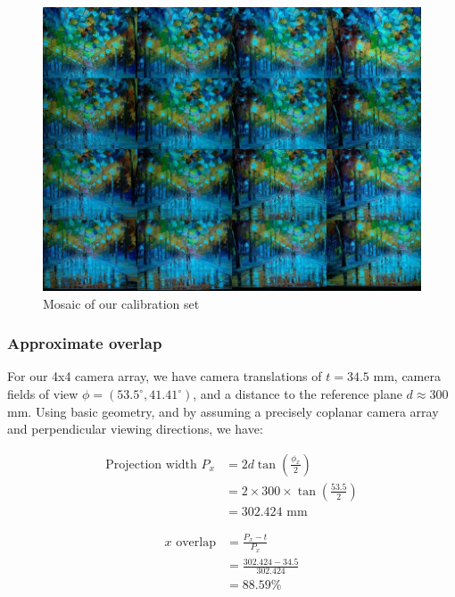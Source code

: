 \documentclass[../main.tex]{subfiles}
\begin{document}
\begin{figure}[H]
    \centering
    \includegraphics[width=0.85\linewidth]{images/calibration-set-painting}
    \caption{Mosaic of our calibration set}
    \label{fig:calibration-set-painting}
\end{figure}

\subsubsection{Approximate overlap}
For our 4x4 camera array, we have camera translations of $t=34.5$ mm, camera fields of view $\phi=(53.5^{\circ},41.41^{\circ})$, and a distance to the reference plane $d\approx300$ mm. Using basic geometry, and by assuming a precisely coplanar camera array and perpendicular viewing directions, we have:

\begin{equation} \label{eq1}
    \begin{split}
    \textrm{Projection width } P_x & = 2d \tan ( \frac{\phi_x} {2} ) \\
                                   & = 2\times300\times \tan ( \frac{53.5} {2} ) \\
                                   & = 302.424 \textrm{ mm}
    \end{split}
\end{equation}

\begin{equation} \label{eq2}
    \begin{split}
        x\textrm{ overlap} & = \frac{P_x-t}{P_x} \\
                           & = \frac{302.424 - 34.5}{302.424} \\ 
                           & = 88.59\%
    \end{split}
\end{equation}
\end{document}
